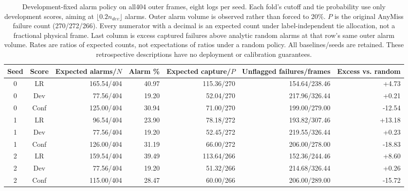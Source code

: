 \begin{table}[t]
\caption{Development-fixed alarm policy on all404 outer frames, eight logs per seed. Each fold's cutoff and tie probability use only development scores, aiming at $\lfloor0.2n_{dev}\rfloor$ alarms. Outer alarm volume is observed rather than forced to 20\%. $P$ is the original AnyMiss failure count (270/272/266). Every numerator with a decimal is an expected count under label-independent tie allocation, not a fractional physical frame. Last column is excess captured failures above analytic random alarms at that row's same outer alarm volume. Rates are ratios of expected counts, not expectations of ratios under a random policy. All baselines/seeds are retained. These retrospective descriptions have no deployment or calibration guarantees.}
\label{tab:fixedpolicy}
\centering\small
\setlength{\tabcolsep}{5pt}
\begin{tabular}{ccrrrrr}\toprule
Seed & Score & Expected alarms/$N$ & Alarm \% & Expected capture/$P$ & Unflagged failures/frames & Excess vs. random\\\midrule
0 & LR & 165.54/404 & 40.97 & 115.36/270 & 154.64/238.46 & +4.73 \\
0 & Dev & 77.56/404 & 19.20 & 52.04/270 & 217.96/326.44 & +0.21 \\
0 & Conf & 125.00/404 & 30.94 & 71.00/270 & 199.00/279.00 & -12.54 \\
1 & LR & 96.54/404 & 23.90 & 78.18/272 & 193.82/307.46 & +13.18 \\
1 & Dev & 77.56/404 & 19.20 & 52.45/272 & 219.55/326.44 & +0.23 \\
1 & Conf & 126.00/404 & 31.19 & 66.00/272 & 206.00/278.00 & -18.83 \\
2 & LR & 159.54/404 & 39.49 & 113.64/266 & 152.36/244.46 & +8.60 \\
2 & Dev & 77.56/404 & 19.20 & 51.32/266 & 214.68/326.44 & +0.26 \\
2 & Conf & 115.00/404 & 28.47 & 60.00/266 & 206.00/289.00 & -15.72 \\
\bottomrule\end{tabular}
\end{table}
